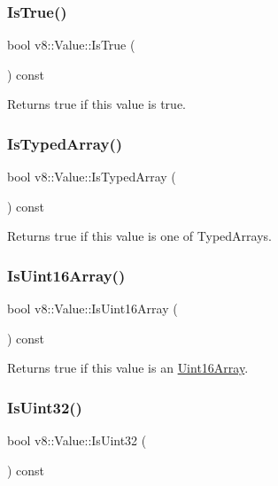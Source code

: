 \subsubsection{\texorpdfstring{Is\+True()}{IsTrue()}}
{\footnotesize\ttfamily bool v8\+::\+Value\+::\+Is\+True (\begin{DoxyParamCaption}{ }\end{DoxyParamCaption}) const}

Returns true if this value is true. \mbox{\label{classv8_1_1Value_a01183cf30ba5e6383cdca82daee630d8}} 
\subsubsection{\texorpdfstring{Is\+Typed\+Array()}{IsTypedArray()}}
{\footnotesize\ttfamily bool v8\+::\+Value\+::\+Is\+Typed\+Array (\begin{DoxyParamCaption}{ }\end{DoxyParamCaption}) const}

Returns true if this value is one of Typed\+Arrays. \mbox{\label{classv8_1_1Value_af3e8da420ddc0f92aac5dbfe61ac9699}} 
\subsubsection{\texorpdfstring{Is\+Uint16\+Array()}{IsUint16Array()}}
{\footnotesize\ttfamily bool v8\+::\+Value\+::\+Is\+Uint16\+Array (\begin{DoxyParamCaption}{ }\end{DoxyParamCaption}) const}

Returns true if this value is an \mbox{\hyperlink{classv8_1_1Uint16Array}{Uint16\+Array}}. \mbox{\label{classv8_1_1Value_ae30d50fb96b03239bc90ceb07b6e46fc}} 
\subsubsection{\texorpdfstring{Is\+Uint32()}{IsUint32()}}
{\footnotesize\ttfamily bool v8\+::\+Value\+::\+Is\+Uint32 (\begin{DoxyParamCaption}{ }\end{DoxyParamCaption}) const}

